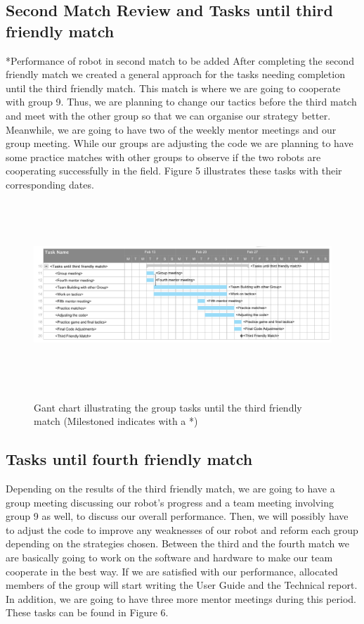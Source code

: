 \documentclass{article}
\begin{document}
\subsection{Second Match Review and Tasks until third friendly match}
*Performance of robot in second match to be added
After completing the second friendly match we created a general approach for the tasks needing completion until the third friendly match. This match is where we are going to cooperate with group 9. Thus, we are planning to change our tactics before the third match and meet with the other group so that we can organise our strategy better. Meanwhile, we are going to have two of the weekly mentor meetings and our group meeting. While our groups are adjusting the code we are planning to have some practice matches with other groups to observe if the two robots are cooperating successfully in the field. Figure 5 illustrates these tasks with their corresponding dates.
\begin{figure}[H]
	\centering
	\begin{minipage}{1\textwidth}
		\centering
		\includegraphics[width=16cm, height=7cm]{ThirdFriendlyMatch.png}\\
		\caption{Gant chart illustrating the group tasks until the third friendly match (Milestoned indicates with a *)}
	\end{minipage}%
\end{figure}

\subsection{Tasks until fourth friendly match}
Depending on the results of the third friendly match, we are going to have a group meeting discussing our robot's progress and a team meeting involving group 9 as well, to discuss our overall performance. Then, we will possibly have to adjust the code to improve any weaknesses of our robot and reform each group depending on the strategies chosen. Between the third and the fourth match we are basically going to work on the software and hardware to make our team cooperate in the best way. If we are satisfied with our performance, allocated members of the group will start writing the User Guide and the Technical report. In addition, we are going to have three more mentor meetings during this period. These tasks can be found in Figure 6.
\end{document}
